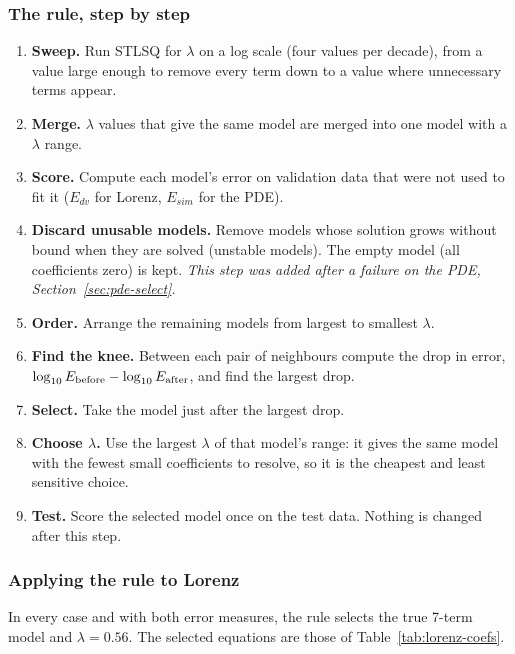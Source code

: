 \documentclass[11pt,a4paper]{article}
\begin{document}
\subsubsection{The rule, step by step}
\begin{enumerate}
  \item \textbf{Sweep.} Run STLSQ for $\lambda$ on a log scale (four values per decade), from a value large enough to remove every term down to a value where unnecessary terms appear.
  \item \textbf{Merge.} $\lambda$ values that give the same model are merged into one model with a $\lambda$ range.
  \item \textbf{Score.} Compute each model's error on validation data that were not used to fit it ($E_{dv}$ for Lorenz, $E_{sim}$ for the PDE).
  \item \textbf{Discard unusable models.} Remove models whose solution grows without bound when they are solved (unstable models). The empty model (all coefficients zero) is kept. \emph{This step was added after a failure on the PDE, Section~\ref{sec:pde-select}.}
  \item \textbf{Order.} Arrange the remaining models from largest to smallest $\lambda$.
  \item \textbf{Find the knee.} Between each pair of neighbours compute the drop in error, $\log_{10}E_{\rm before}-\log_{10}E_{\rm after}$, and find the largest drop.
  \item \textbf{Select.} Take the model just after the largest drop.
  \item \textbf{Choose $\lambda$.} Use the largest $\lambda$ of that model's range: it gives the same model with the fewest small coefficients to resolve, so it is the cheapest and least sensitive choice.
  \item \textbf{Test.} Score the selected model once on the test data. Nothing is changed after this step.
\end{enumerate}

\subsubsection{Applying the rule to Lorenz}\label{sec:lorenz-apply}
\begin{table}[H]\centering\small

\caption{The rule (R4) applied to every Lorenz case.}
\end{table}
In every case and with both error measures, the rule selects the true 7-term model and $\lambda=0.56$. The selected equations are those of Table~\ref{tab:lorenz-coefs}.
\end{document}
